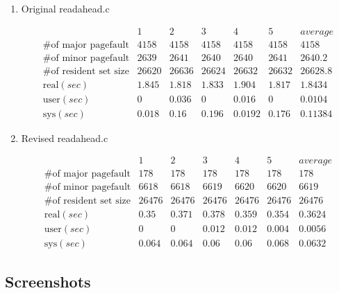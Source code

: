 \documentclass{article}
\renewcommand{\_}{\textscale{.5}{\textunderscore}}
\begin{document}
\begin{enumerate}
    \item Original readahead.c

    $$
    \begin{array}{c|c|c|c|c|c|c}
        & 1 & 2 & 3 & 4 & 5 & average \\
        \hline
        \text{\# of major pagefault}    & 4158	& 4158	& 4158	& 4158	& 4158	& 4158 \\
        \text{\# of minor pagefault}    & 2639	& 2641	& 2640	& 2640	& 2641	& 2640.2 \\
        \text{\# of resident set size}  & 26620	& 26636 & 26624	& 26632	& 26632	& 26628.8 \\
        \hline
        \text{real}(sec) & 1.845 & 1.818 & 1.833 & 1.904  & 1.817 & 1.8434 \\ 
        \text{user}(sec) & 0	 & 0.036 & 0	 & 0.016  & 0	  & 0.0104 \\
        \text{sys}(sec)  & 0.018 & 0.16	 & 0.196 & 0.0192 & 0.176 & 0.11384
    \end{array}
    $$    

    \item Revised readahead.c

    $$
    \begin{array}{c|c|c|c|c|c|c}
        & 1 & 2 & 3 & 4 & 5 & average \\
        \hline
        \text{\# of major pagefault}    & 178	& 178	& 178	& 178	& 178	& 178 \\
        \text{\# of minor pagefault}    & 6618	& 6618	& 6619	& 6620	& 6620	& 6619 \\
        \text{\# of resident set size}  & 26476 & 26476 & 26476 & 26476 & 26476 & 26476 \\
        \hline
        \text{real}(sec) & 0.35	 & 0.371 & 0.378 & 0.359 & 0.354 & 0.3624 \\ 
        \text{user}(sec) & 0	 & 0	 & 0.012 & 0.012 & 0.004 & 0.0056 \\
        \text{sys}(sec)  & 0.064 & 0.064 & 0.06	 & 0.06	 & 0.068 & 0.0632
    \end{array}
    $$    

\end{enumerate}

\newpage
\subsection*{Screenshots}
\end{document}
